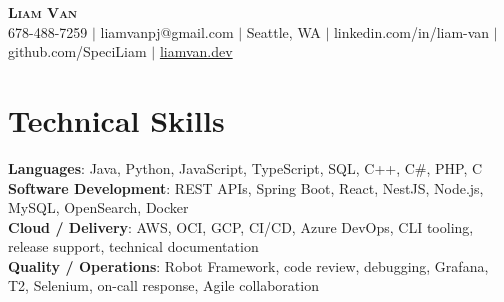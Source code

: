 \documentclass[letterpaper,11pt]{article}
\begin{document}

%
\begin{center}
    \textbf{\Huge \scshape Liam Van} \\ \vspace{1pt}
    \small 678-488-7259 $|$ \small {liamvanpj@gmail.com} $|$ Seattle, WA
 {{$|$ linkedin.com/in/liam-van} {$|$ github.com/SpeciLiam} {$|$ \href{https://liamvan.dev}{liamvan.dev}}}

\end{center}

\section{Technical Skills}
 \begin{itemize}[leftmargin=0.15in, label={}]
    \small{\item{
     \textbf{Languages}{: Java, Python, JavaScript, TypeScript, SQL, C++, C\#, PHP, C} \\
     \textbf{Software Development}{: REST APIs, Spring Boot, React, NestJS, Node.js, MySQL, OpenSearch, Docker} \\
     \textbf{Cloud / Delivery}{: AWS, OCI, GCP, CI/CD, Azure DevOps, CLI tooling, release support, technical documentation} \\
     \textbf{Quality / Operations}{: Robot Framework, code review, debugging, Grafana, T2, Selenium, on-call response, Agile collaboration} \\
    }}
 \end{itemize}
%

\end{document}
